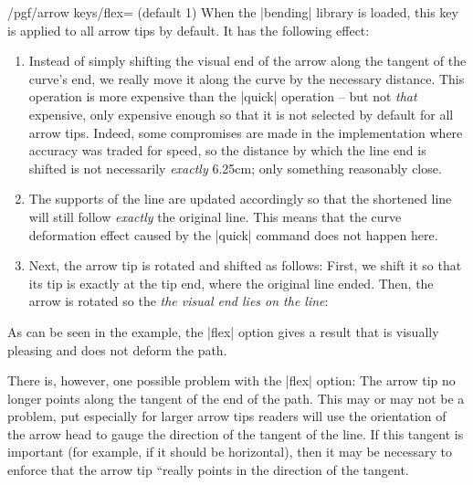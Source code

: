 \begin{key}{/pgf/arrow keys/flex= (default 1)}
  When the |bending| library is loaded, this key is applied 
  to all arrow tips by default. It has the following effect:
  \begin{enumerate}
  \item Instead of simply shifting the visual end of the arrow along
    the tangent of the curve's end, we really move it along the curve
    by the necessary distance. This operation is more expensive than
    the |quick| operation -- but not \emph{that} expensive, only
    expensive enough so that it is not selected by default for all
    arrow tips. Indeed, some compromises are made in the
    implementation where accuracy was traded for speed, so the
    distance by which the line end is shifted is not necessarily
    \emph{exactly} 6.25cm; only something reasonably close.
  \item The supports of the line are updated accordingly so that the
    shortened line will still follow \emph{exactly} the original
    line. This means that the curve deformation effect caused by the
    |quick| command does not happen here.
  \item Next, the arrow tip is rotated and shifted as follows: First,
    we shift it so that its tip is exactly at the tip end, where the
    original line ended. Then, the arrow is rotated so the \emph{the
      visual end lies on the line}:
\begin{codeexample}[]
\end{codeexample}
  \end{enumerate}

  As can be seen in the example, the |flex| option gives a result that
  is visually pleasing and does not deform the path.
  
  There is, however, one possible problem with the |flex| option: The
  arrow tip no longer points along the tangent of the end of the
  path. This may or may not be a problem, put especially for larger
  arrow tips readers will use the orientation of the arrow head to
  gauge the direction of the tangent of the line. If this tangent is
  important (for example, if it should be horizontal), then it may be
  necessary to enforce that the arrow tip ``really points in the
  direction of the tangent.


\end{key}

